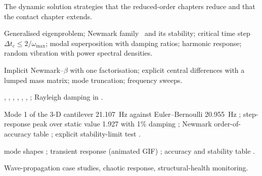 \begin{description}[style=nextline,leftmargin=1em]
\item[Focus] The dynamic solution strategies that the reduced-order chapters reduce and that the contact chapter extends.
\item[Mathematics] Generalised eigenproblem; Newmark family~\cite{newmark1959} and its stability; critical time step $\Delta t_c \le 2/\omega_{\max}$; modal superposition with damping ratios; harmonic response; random vibration with power spectral densities.
\item[Algorithm] Implicit Newmark--$\beta$ with one factorisation; explicit central differences with a lumped mass matrix; mode truncation; frequency sweeps.
\item[Implementation] , , , , , , ; Rayleigh damping in .
\item[Verification] Mode 1 of the 3-D cantilever 21.107~Hz against Euler--Bernoulli 20.955~Hz \have{}; step-response peak over static value 1.927 with 1\% damping \have{}; Newmark order-of-accuracy table ; explicit stability-limit test .
\item[Figures and tables]  mode shapes \have{};  transient response (animated GIF) \have{}; accuracy and stability table .
\item[Exclusions] Wave-propagation case studies, chaotic response, structural-health monitoring.
\end{description}


